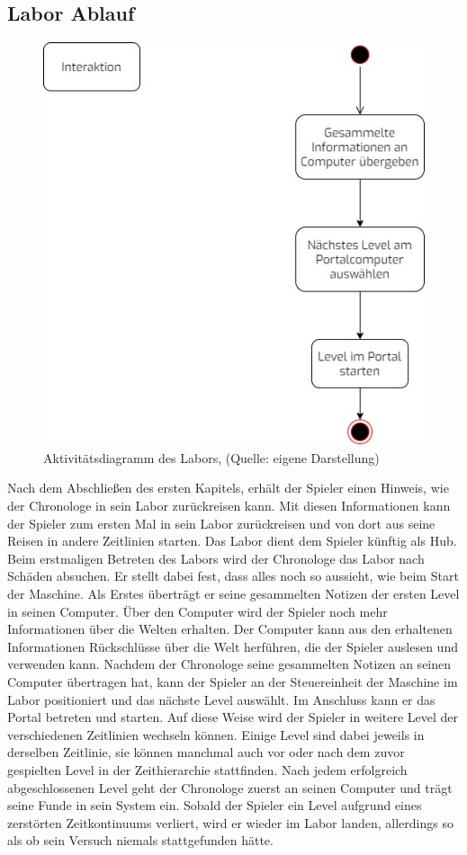 \subsection{Labor Ablauf}
\begin{figure}[ht]
\centering
\includegraphics[width=0.4\linewidth]{content/pictures/labor_loop.jpg}
\caption{Aktivitätsdiagramm des Labors, (Quelle: eigene Darstellung)}
\label{fig:labor_loop}
\end{figure}

Nach dem Abschließen des ersten Kapitels, erhält der Spieler einen Hinweis, wie der Chronologe in sein Labor zurückreisen kann. Mit diesen Informationen kann der Spieler zum ersten Mal in sein Labor zurückreisen und von dort aus seine Reisen in andere Zeitlinien starten. Das Labor dient dem Spieler künftig als Hub. Beim erstmaligen Betreten des Labors wird der Chronologe das Labor nach Schäden absuchen. Er stellt dabei fest, dass alles noch so aussieht, wie beim Start der Maschine. Als Erstes überträgt er seine gesammelten Notizen der ersten Level in seinen Computer. Über den Computer wird der Spieler noch mehr Informationen über die Welten erhalten. Der Computer kann aus den erhaltenen Informationen Rückschlüsse über die Welt herführen, die der Spieler auslesen und verwenden kann. Nachdem der Chronologe seine gesammelten Notizen an seinen Computer übertragen hat, kann der Spieler an der Steuereinheit der Maschine im Labor positioniert und das nächste Level auswählt. Im Anschluss kann er das Portal betreten und starten. Auf diese Weise wird der Spieler in weitere Level der verschiedenen Zeitlinien wechseln können. Einige Level sind dabei jeweils in derselben Zeitlinie, sie können manchmal auch vor oder nach dem zuvor gespielten Level in der Zeithierarchie stattfinden. Nach jedem erfolgreich abgeschlossenen Level geht der Chronologe zuerst an seinen Computer und trägt seine Funde in sein System ein. Sobald der Spieler ein Level aufgrund eines zerstörten Zeitkontinuums verliert, wird er wieder im Labor landen, allerdings so als ob sein Versuch niemals stattgefunden hätte.

